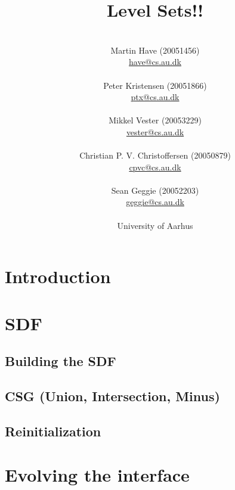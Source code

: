 \documentclass[a4paper, oneside]{memoir}
\title{Level Sets!!}
\author{
 \\
  Martin Have (20051456)\\
  \url{have@cs.au.dk}\\
  \\
  Peter Kristensen (20051866)\\
  \url{ptx@cs.au.dk}\\
  \\
  Mikkel Vester (20053229)\\
  \url{vester@cs.au.dk}\\
  \\
  Christian P. V. Christoffersen (20050879)\\
  \url{cpvc@cs.au.dk}\\
  \\
  Sean Geggie (20052203)\\
  \url{geggie@cs.au.dk}\\
  \\
  University of Aarhus
}
\begin{document}
\maketitle{}


\begin{comment} %
|----------------------------+----------+--------|
| Afsnit                     | Indhold  | Hvem   |
|----------------------------+----------+--------|
| Intro                      | ch. 1,2  | have   |
| - noget om lys/raycasting  |          | ptx    |
| Build SDF / Discretization | artikel? | vester |
| Reinitialize               | ch. 7    | cpvc   |
| Motion                     | ch. 4,6  | ptx    |
| Externally gen. vf.        | ch. 3    | geggie |
| Godunov                    | ch. 5    | cpvc   |
|----------------------------+----------+--------|
\end{comment}

\newpage

\tableofcontents{}
\listoftodos
\chapter{Introduction}
\label{chap:introduction}
  

\chapter{SDF}
\label{chap:sdf}


\section{Building the SDF}
\label{sec:initialization}



\section{CSG (Union, Intersection, Minus)}
\label{sec:csg}



\section{Reinitialization}
\label{sec:reinitialize}



\chapter{Evolving the interface}
\label{chap:motion}
\end{document}
